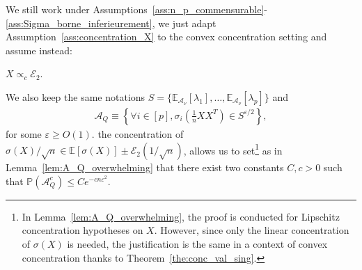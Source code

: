 \documentclass[a4papaer, titlepage]{book}
\begin{document}

We still work under Assumptions~\ref{ass:n_p_commensurable}-\ref{ass:Sigma_borne_inferieurement}, we just adapt Assumption~\ref{ass:concentration_X} to the convex concentration setting and assume instead:
\addtocounter{assumption}{-4}
\begin{assconv0}\label{ass:concentration_covexe_X}
  $X \propto_c \mathcal E_2$.
\end{assconv0}
\addtocounter{assumption}{3}

We also keep the same notations $S = \{\mathbb E_{\mathcal A_\nu}[\lambda_1], \ldots, \mathbb E_{\mathcal A_\nu}[\lambda_p]\}$ and 
\begin{align*}
  \mathcal A_Q \equiv \left\{ \forall i \in[p], \sigma_i \left( \frac{1}{n}XX^T \right) \in S^{\varepsilon/2} \right\},
\end{align*}
for some $\varepsilon \geq O(1)$.
the concentration of $\sigma(X) / \sqrt n \in \mathbb E[\sigma(X)] \pm \mathcal E_2(1/\sqrt n)$, allows us to set\footnote{In Lemma~\ref{lem:A_Q_overwhelming}, the proof is conducted for Lipschitz concentration hypotheses on $X$. However, since only the linear concentration of $\sigma(X)$ is needed, the justification is the same in a context of convex concentration thanks to Theorem~\ref{the:conc_val_sing}.} as in Lemma~\ref{lem:A_Q_overwhelming} 
that there exist two constants $C,c>0$ such that $\mathbb P \left(\mathcal A_Q^c\right) \leq C e^{-cn\varepsilon^2}$.
\end{document}

